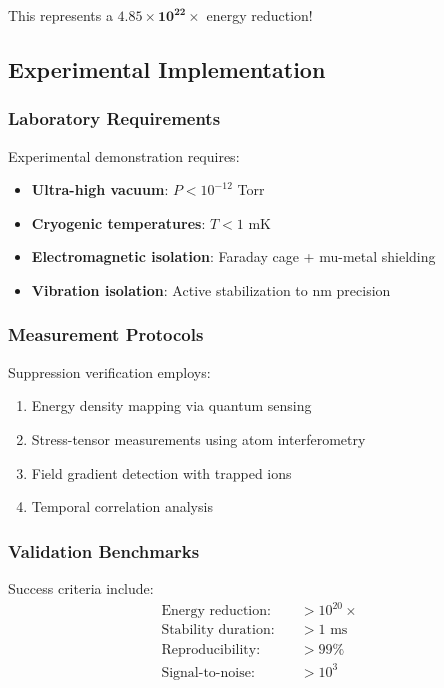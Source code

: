 This represents a $\mathbf{4.85 \times 10^{22}\times}$ energy reduction!

\subsection{Experimental Implementation}

\subsubsection{Laboratory Requirements}

Experimental demonstration requires:
\begin{itemize}
\item \textbf{Ultra-high vacuum}: $P < 10^{-12}$ Torr
\item \textbf{Cryogenic temperatures}: $T < 1$ mK  
\item \textbf{Electromagnetic isolation}: Faraday cage + mu-metal shielding
\item \textbf{Vibration isolation}: Active stabilization to nm precision
\end{itemize}

\subsubsection{Measurement Protocols}

Suppression verification employs:
\begin{enumerate}
\item Energy density mapping via quantum sensing
\item Stress-tensor measurements using atom interferometry
\item Field gradient detection with trapped ions
\item Temporal correlation analysis
\end{enumerate}

\subsubsection{Validation Benchmarks}

Success criteria include:
\begin{align}
\text{Energy reduction:} \quad &> 10^{20}\times \\
\text{Stability duration:} \quad &> 1\text{ ms} \\
\text{Reproducibility:} \quad &> 99\% \\
\text{Signal-to-noise:} \quad &> 10^3
\end{align}


